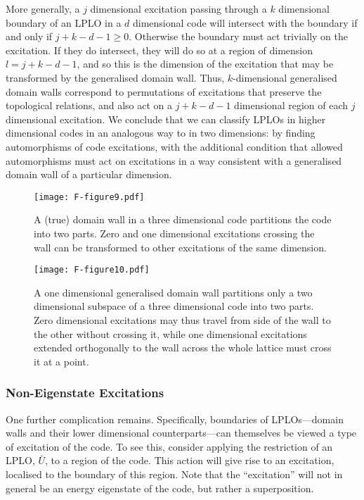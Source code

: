 \documentclass[pra,twocolumn,a4paper,nofootinbib]{revtex4-1}
\begin{document}
More generally, a $j$ dimensional excitation passing through a $k$ dimensional boundary of an LPLO in a $d$ dimensional code will intersect with the boundary if and only if $j+k-d-1 \geq 0$. Otherwise the boundary must act trivially on the excitation. If they do intersect, they will do so at a region of dimension $l=j+k-d-1$, and so this is the dimension of the excitation that may be transformed by the generalised domain wall. Thus, $k$-dimensional generalised domain walls correspond to permutations of excitations that preserve the topological relations, and also act on a $j+k-d-1$ dimensional region of each $j$ dimensional excitation.  We conclude that we can classify LPLOs in higher dimensional codes in an analogous way to in two dimensions: by finding automorphisms of code excitations, with the additional condition that allowed automorphisms must act on excitations in a way consistent with a generalised domain wall of a particular dimension.

\begin{figure}
\centering
\texttt{[image: F-figure9.pdf]}
\caption{A (true) domain wall in a three dimensional code partitions the code into two parts. Zero and one dimensional excitations crossing the wall can be transformed to other excitations of the same dimension. \label{fig:2DDW}}
\end{figure}

\begin{figure}
\centering
\texttt{[image: F-figure10.pdf]}
\caption{A one dimensional generalised domain wall partitions only a two dimensional subspace of a three dimensional code into two parts. Zero dimensional excitations may thus travel from side of the wall to the other without crossing it, while one dimensional excitations extended orthogonally to the wall across the whole lattice must cross it at a point. \label{fig:1DDW}}
\end{figure}

\subsubsection{Non-Eigenstate Excitations}
One further complication remains. Specifically, boundaries of LPLOs---domain walls and their lower dimensional counterparts---can themselves be viewed a type of excitation of the code. To see this, consider applying the restriction of an LPLO, $\bar{U}$, to a region of the code. This action will give rise to an excitation, localised to the boundary of this region.  Note that the ``excitation'' will not in general be an energy eigenstate of the code, but rather a superposition.  
\end{document}
